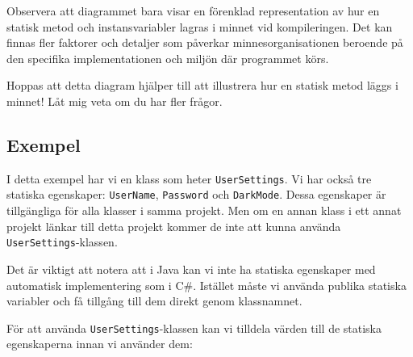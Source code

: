 Observera att diagrammet bara visar en förenklad representation av hur
en statisk metod och instansvariabler lagras i minnet vid kompileringen.
Det kan finnas fler faktorer och detaljer som påverkar
minnesorganisationen beroende på den specifika implementationen och
miljön där programmet körs.

Hoppas att detta diagram hjälper till att illustrera hur en statisk
metod läggs i minnet! Låt mig veta om du har fler frågor.

\hypertarget{exempel}{%
\subsection{Exempel}\label{exempel}}

\hypertarget{cb1}{}
\begin{Shaded}
\begin{Highlighting}[]
 \OperatorTok{\{}
      \OperatorTok{;}
      \OperatorTok{;}
      \OperatorTok{=} \OperatorTok{;}
\OperatorTok{\}}
\end{Highlighting}
\end{Shaded}

I detta exempel har vi en klass som heter \texttt{UserSettings}. Vi har
också tre statiska egenskaper: \texttt{UserName}, \texttt{Password} och
\texttt{DarkMode}. Dessa egenskaper är tillgängliga för alla klasser i
samma projekt. Men om en annan klass i ett annat projekt länkar till
detta projekt kommer de inte att kunna använda
\texttt{UserSettings}-klassen.

Det är viktigt att notera att i Java kan vi inte ha statiska egenskaper
med automatisk implementering som i C\#. Istället måste vi använda
publika statiska variabler och få tillgång till dem direkt genom
klassnamnet.

För att använda \texttt{UserSettings}-klassen kan vi tilldela värden
till de statiska egenskaperna innan vi använder dem:

\hypertarget{cb2}{}
\begin{Shaded}
\begin{Highlighting}[]
 \OperatorTok{=} \OperatorTok{;}
 \OperatorTok{=} \OperatorTok{;}
 \OperatorTok{=} \OperatorTok{;}
\end{Highlighting}
\end{Shaded}

